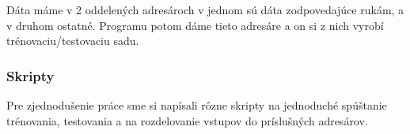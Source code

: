 Dáta máme v 2 oddelených adresároch v jednom sú dáta zodpovedajúce rukám, a v druhom ostatné. Programu potom dáme tieto adresáre a on si z nich vyrobí trénovaciu/testovaciu sadu.

\subsubsection{Skripty}
Pre zjednodušenie práce sme si napísali rôzne skripty na jednoduché spúštanie trénovania, testovania a na rozdelovanie vstupov do príslušných adresárov.
